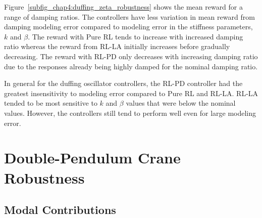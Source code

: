 %
Figure~\ref{subfig_chap4:duffing_zeta_robustness} shows the mean reward for a range of damping ratios. The controllers have less variation in mean reward from damping modeling error compared to modeling error in the stiffness parameters, $k$ and $\beta$. The reward with Pure RL tends to increase with increased damping ratio whereas the reward from RL-LA initially increases before gradually decreasing. The reward with RL-PD only decreases with increasing damping ratio due to the responses already being highly damped for the nominal damping ratio.


In general for the duffing oscillator controllers, the RL-PD controller had the greatest insensitivity to modeling error compared to Pure RL and RL-LA. RL-LA tended to be most sensitive to $k$ and $\beta$ values that were below the nominal values. However, the controllers still tend to perform well even for large modeling error.

\section{Double-Pendulum Crane Robustness}

\subsection{Modal Contributions}

